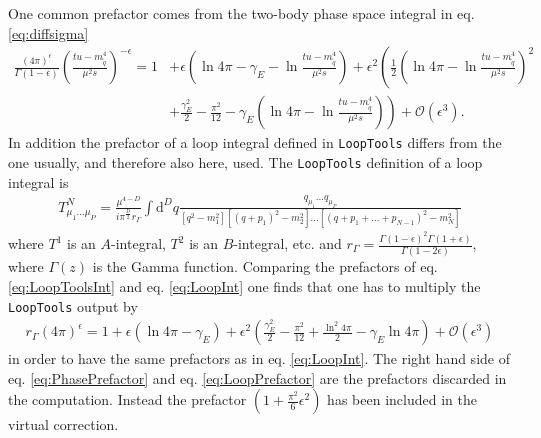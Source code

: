 One common prefactor comes from the two-body phase space integral in eq. \eqref{eq:diffsigma}
\begin{align}
\frac{(4\pi)^\epsilon}{\Gamma(1-\epsilon)}\left( \frac{tu - m_{\tilde{q}}^4}{\mu^2 s} \right)^{-\epsilon} = 1 &+ \epsilon\left( \ln 4\pi -\gamma_E - \ln \frac{tu - m_{\tilde{q}}^4}{\mu^2 s} \right) 
+ \epsilon^2\left( \frac{1}{2}\left( \ln 4\pi - \ln \frac{tu - m_{\tilde{q}}^4}{\mu^2 s} \right)^2 \right.\nonumber\\
&+ \left.\frac{\gamma_E^2}{2} - \frac{\pi^2}{12} - \gamma_E\left( \ln 4\pi - \ln \frac{tu - m_{\tilde{q}}^4}{\mu^2 s} \right) \right) + \mathcal{O}(\epsilon^3).\label{eq:PhasePrefactor}
\end{align}
In addition the prefactor of a loop integral defined in \texttt{LoopTools} differs from the one usually, and therefore also here, used. The \texttt{LoopTools} definition\cite{LoopToolsManual} of a loop integral is 
\begin{align}
T^N_{\mu_1\hdots\mu_P} = \frac{\mu^{4-D}}{i\pi^{\frac{D}{2}}r_\Gamma}\int\mathrm{d}^Dq\frac{q_{\mu_1} \hdots q_{\mu_P}}{[q^2-m_1^2] [(q+p_1)^2-m_2^2] \hdots [(q+p_1+ \hdots +p_{N-1})^2-m_N^2]}\label{eq:LoopToolsInt}
\end{align}
where $T^1$ is an $A$-integral, $T^2$ is an $B$-integral, etc. and $r_\Gamma = \frac{\Gamma(1-\epsilon)^2\Gamma(1+\epsilon)}{\Gamma(1-2\epsilon)}$, where $\Gamma(z)$ is the Gamma function. Comparing the prefactors of eq. \eqref{eq:LoopToolsInt} and eq.  \eqref{eq:LoopInt} one finds that one has to multiply the \texttt{LoopTools} output by
\begin{align}
r_\Gamma (4\pi)^\epsilon = 1 + \epsilon(\ln 4\pi -\gamma_E) + \epsilon^2\left( \frac{\gamma_E^2}{2} - \frac{\pi^2}{12} + \frac{\ln^2 4\pi}{2} - \gamma_E\ln 4\pi \right) + \mathcal{O}(\epsilon^3)\label{eq:LoopPrefactor}
\end{align}
in order to have the same prefactors as in eq. \eqref{eq:LoopInt}. The right hand side of eq. \eqref{eq:PhasePrefactor} and eq. \eqref{eq:LoopPrefactor} are the prefactors discarded in the computation. Instead the prefactor $\left( 1 + \frac{\pi^2}{6}\epsilon^2 \right)$ has been included in the virtual correction.


